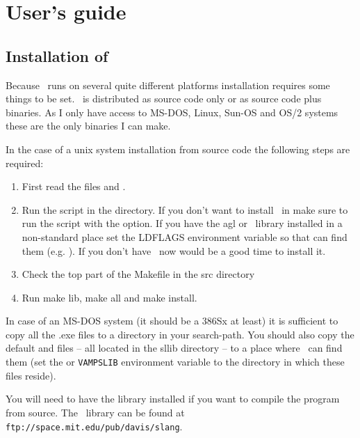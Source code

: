
\part{User's guide}

\chapter{Installation of \vamps}
Because \vamps\ runs on several quite different platforms installation
requires some things to be set. \vamps\ is distributed as source code
only or as source code plus binaries. As I only have access to MS-DOS,
Linux, Sun-OS and OS/2 systems these are the only binaries I can make.

In the case of a {\sc unix} system installation from source
code the following steps are required:
\begin{enumerate}
\item First read the files  and .

\item 
Run the  script in the  directory. If you
don't want to install \vamps\ in  make sure to run
the  script with the
 option. If you have the agl or
\slang\ library installed in a non-standard place set the LDFLAGS
environment variable so that  can find them
(e.g. ). If you don't have
\slang\ now would be a good time to install it.

\item Check the top part of the Makefile in the {\sc src} directory

\item Run make lib, make all and make install.
\end{enumerate}

In case of an MS-DOS system (it should be a 386Sx at least) it is
sufficient to copy all the .exe files to a directory in your
search-path. You should also copy the default {\tt {}}
and {\tt {}} files -- all located in the sllib directory
-- to a place where \vamps\ can find them (set the {\tt {}}
or {\tt VAMPSLIB} environment variable to the directory in which these
files reside).

You will need to have the \slang{} library installed if you want to
compile the program from source. The \slang\ library can be found at
{\tt ftp://space.mit.edu/pub/davis/slang}.

